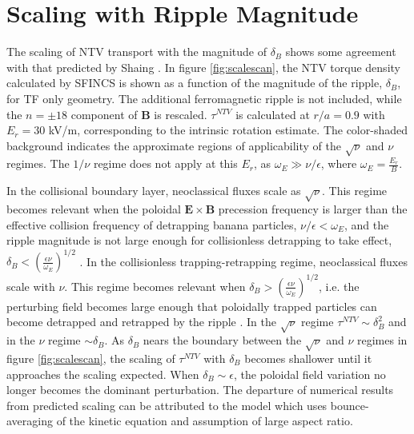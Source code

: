 \documentclass{article}
\begin{document}
\section{Scaling with Ripple Magnitude}\label{scaling}
The scaling of NTV transport with the magnitude of $\delta_B$ shows some agreement with that predicted by Shaing \cite{Shaing2008}. In figure \ref{fig:scalescan}, the NTV torque density calculated by SFINCS is shown as a function of the magnitude of the ripple, $\delta_B$, for TF only geometry. The additional ferromagnetic ripple is not included, while the $n= \pm18$ component of $\bm{B}$ is rescaled. $\tau^{NTV}$ is calculated at $r/a = 0.9$ with $E_r = 30$ kV/m, corresponding to the intrinsic rotation estimate. The color-shaded background indicates the approximate regions of applicability of the $\sqrt{\nu}$ and $\nu$ regimes. The $1/\nu$ regime does not apply at this $E_r$, as $\omega_E \gg \nu/\epsilon$, where $\omega_E = \frac{E_r}{B}$. 

In the collisional boundary layer, neoclassical fluxes scale as $\sqrt{\nu}$. This regime becomes relevant when the poloidal $\bm{E} \times \bm{B}$ precession frequency is larger than the effective collision frequency of detrapping banana particles, $\nu/\epsilon < \omega_E$, and the ripple magnitude is not large enough for collisionless detrapping to take effect, $\delta_B < \left( \frac{ \epsilon \nu}{\omega_E} \right)^{1/2}$ \cite{Shaing2008}. 
In the collisionless trapping-retrapping regime, neoclassical fluxes scale with $\nu$. This regime becomes relevant when $\delta_B > \left( \frac{ \epsilon \nu}{\omega_E} \right)^{1/2}$, i.e. the perturbing field becomes large enough that poloidally trapped particles can become detrapped and retrapped by the ripple \cite{Shaing2010}. In the $\sqrt{\nu}$ regime $\tau^{NTV} \sim \delta_B^2$ and in the $\nu$ regime $\sim \delta_B$. As $\delta_B$ nears the boundary between the $\sqrt{\nu}$ and $\nu$ regimes in figure \ref{fig:scalescan}, the scaling of $\tau^{NTV}$ with $\delta_B$ becomes shallower until it approaches the scaling expected. When $\delta_B \sim \epsilon$, the poloidal field variation no longer becomes the dominant perturbation. The departure of numerical results from predicted scaling can be attributed to the model which uses bounce-averaging of the kinetic equation and assumption of large aspect ratio. 
\end{document}
